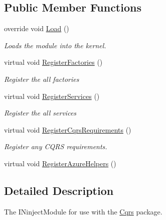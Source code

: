 \subsection*{Public Member Functions}
\begin{DoxyCompactItemize}
\item 
override void \hyperlink{classCqrs_1_1Ninject_1_1Azure_1_1DocumentDb_1_1Configuration_1_1AzureDocumentDbModule_ad9536f1eb7820c9066f2ce5f711ee55e_ad9536f1eb7820c9066f2ce5f711ee55e}{Load} ()
\begin{DoxyCompactList}\small\item\em Loads the module into the kernel. \end{DoxyCompactList}\item 
virtual void \hyperlink{classCqrs_1_1Ninject_1_1Azure_1_1DocumentDb_1_1Configuration_1_1AzureDocumentDbModule_a178aad844dd24aee601e304a0f538108_a178aad844dd24aee601e304a0f538108}{Register\+Factories} ()
\begin{DoxyCompactList}\small\item\em Register the all factories \end{DoxyCompactList}\item 
virtual void \hyperlink{classCqrs_1_1Ninject_1_1Azure_1_1DocumentDb_1_1Configuration_1_1AzureDocumentDbModule_ae47d987c2f32d3167ebda105f5fc8743_ae47d987c2f32d3167ebda105f5fc8743}{Register\+Services} ()
\begin{DoxyCompactList}\small\item\em Register the all services \end{DoxyCompactList}\item 
virtual void \hyperlink{classCqrs_1_1Ninject_1_1Azure_1_1DocumentDb_1_1Configuration_1_1AzureDocumentDbModule_ad541aab18b7ca5082dcabaaa5320a15c_ad541aab18b7ca5082dcabaaa5320a15c}{Register\+Cqrs\+Requirements} ()
\begin{DoxyCompactList}\small\item\em Register any C\+Q\+RS requirements. \end{DoxyCompactList}\item 
virtual void \hyperlink{classCqrs_1_1Ninject_1_1Azure_1_1DocumentDb_1_1Configuration_1_1AzureDocumentDbModule_a6528ff9a0213bc0accd217080ff56653_a6528ff9a0213bc0accd217080ff56653}{Register\+Azure\+Helpers} ()
\end{DoxyCompactItemize}


\subsection{Detailed Description}
The I\+Ninject\+Module for use with the \hyperlink{namespaceCqrs}{Cqrs} package. 



